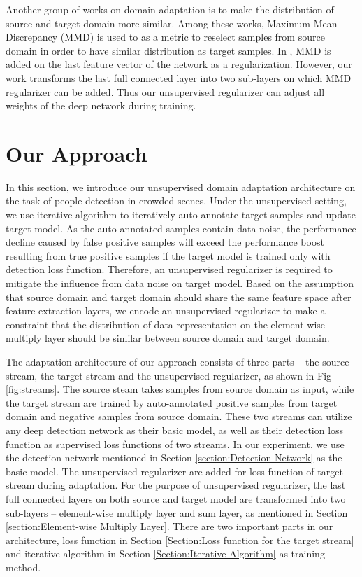 \documentclass[runningheads]{llncs}
\begin{document}
Another group of works \cite{huang2006correcting,gretton2009covariate,gong2013connecting,ghifary2014domain} on domain adaptation is to make the distribution of source and target domain more similar. Among these works, Maximum Mean Discrepancy (MMD) is used to as a metric to reselect samples from source domain in order to have similar distribution as target samples. In \cite{tzeng2014deep}, MMD is added on the last feature vector of the network as a regularization. However, our work transforms the last full connected layer into two sub-layers on which MMD regularizer can be added. Thus our unsupervised regularizer can adjust all weights of the deep network during training.


\section{Our Approach}
\label{section:Our Approach}

In this section, we introduce our unsupervised domain adaptation architecture on the task of people detection in crowded scenes. Under the unsupervised setting, we use iterative algorithm to iteratively auto-annotate target samples and update target model. As the auto-annotated samples contain data noise, the performance decline caused by false positive samples will exceed the performance boost resulting from true positive samples if the target model is trained only with detection loss function. Therefore, an unsupervised regularizer is required to mitigate the influence from data noise on target model. Based on the assumption that source domain and target domain should share the same feature space after feature extraction layers, we encode an unsupervised regularizer to make a constraint that the distribution of data representation on the element-wise multiply layer should be similar between source domain and target domain.

The adaptation architecture of our approach consists of three parts -- the source stream, the target stream and the unsupervised regularizer, as shown in Fig \ref{fig:streams}. The source steam takes samples from source domain as input, while the target stream are trained by auto-annotated positive samples from target domain and negative samples from source domain. These two streams can utilize any deep detection network as their basic model, as well as their detection loss function as supervised loss functions of two streams. In our experiment, we use the detection network mentioned in Section \ref{section:Detection Network} as the basic model. The unsupervised regularizer are added for loss function of target stream during adaptation. For the purpose of unsupervised regularizer, the last full connected layers on both source and target model are transformed into two sub-layers -- element-wise multiply layer and sum layer, as mentioned in Section \ref{section:Element-wise Multiply Layer}. There are two important parts in our architecture, loss function in Section \ref{Section:Loss function for the target stream} and iterative algorithm in Section \ref{Section:Iterative Algorithm} as training method.
\end{document}
